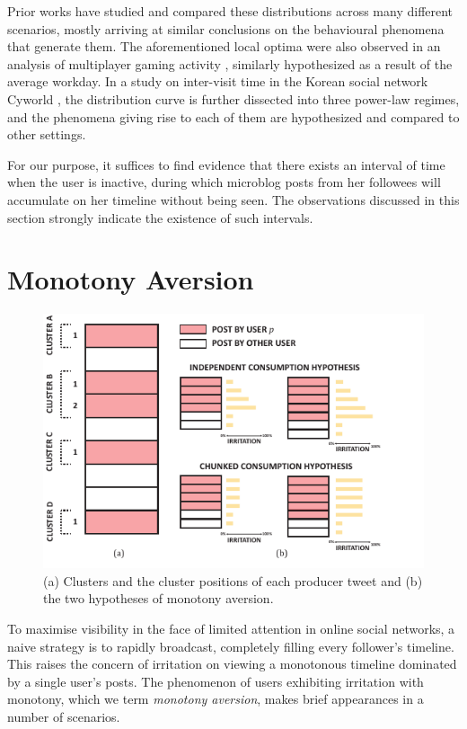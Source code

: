 \documentclass[onecolumn, 12 pt, doublespace, fullpage, letterpaper]{report}
\begin{document}
Prior works have studied and compared these distributions across many different scenarios, mostly arriving at similar conclusions on the behavioural phenomena that generate them. The aforementioned local optima were also observed in an analysis of multiplayer gaming activity \cite{mryglod2015interevent}, similarly hypothesized as a result of the average workday. In a study on inter-visit time in the Korean social network Cyworld \cite{chun2008comparison}, the distribution curve is further dissected into three power-law regimes, and the phenomena giving rise to each of them are hypothesized and compared to other settings.

For our purpose, it suffices to find evidence that there exists an interval of time when the user is inactive, during which microblog posts from her followees will accumulate on her timeline without being seen. The observations discussed in this section strongly indicate the existence of such intervals.

\section{Monotony Aversion}

\begin{figure}
  \includegraphics[width=\linewidth]{monotony.pdf}
  \caption[Notation and hypotheses of monotony aversion.]{(a) Clusters and the cluster positions of each producer tweet and (b) the two hypotheses of monotony aversion.}
  \label{fig:monotony}
\end{figure}

To maximise visibility in the face of limited attention in online social networks, a naive strategy is to rapidly broadcast, completely filling every follower's timeline. This raises the concern of irritation on viewing a monotonous timeline dominated by a single user's posts. The phenomenon of users exhibiting irritation with monotony, which we term \textit{monotony aversion}, makes brief appearances in a number of scenarios.
\end{document}
